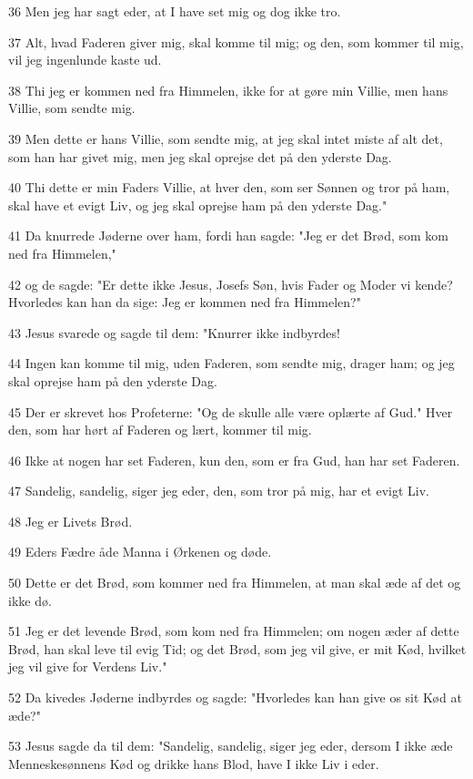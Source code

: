\par 36 Men jeg har sagt eder, at I have set mig og dog ikke tro.
\par 37 Alt, hvad Faderen giver mig, skal komme til mig; og den, som kommer til mig, vil jeg ingenlunde kaste ud.
\par 38 Thi jeg er kommen ned fra Himmelen, ikke for at gøre min Villie, men hans Villie, som sendte mig.
\par 39 Men dette er hans Villie, som sendte mig, at jeg skal intet miste af alt det, som han har givet mig, men jeg skal oprejse det på den yderste Dag.
\par 40 Thi dette er min Faders Villie, at hver den, som ser Sønnen og tror på ham, skal have et evigt Liv, og jeg skal oprejse ham på den yderste Dag."
\par 41 Da knurrede Jøderne over ham, fordi han sagde: "Jeg er det Brød, som kom ned fra Himmelen,"
\par 42 og de sagde: "Er dette ikke Jesus, Josefs Søn, hvis Fader og Moder vi kende? Hvorledes kan han da sige: Jeg er kommen ned fra Himmelen?"
\par 43 Jesus svarede og sagde til dem: "Knurrer ikke indbyrdes!
\par 44 Ingen kan komme til mig, uden Faderen, som sendte mig, drager ham; og jeg skal oprejse ham på den yderste Dag.
\par 45 Der er skrevet hos Profeterne: "Og de skulle alle være oplærte af Gud." Hver den, som har hørt af Faderen og lært, kommer til mig.
\par 46 Ikke at nogen har set Faderen, kun den, som er fra Gud, han har set Faderen.
\par 47 Sandelig, sandelig, siger jeg eder, den, som tror på mig, har et evigt Liv.
\par 48 Jeg er Livets Brød.
\par 49 Eders Fædre åde Manna i Ørkenen og døde.
\par 50 Dette er det Brød, som kommer ned fra Himmelen, at man skal æde af det og ikke dø.
\par 51 Jeg er det levende Brød, som kom ned fra Himmelen; om nogen æder af dette Brød, han skal leve til evig Tid; og det Brød, som jeg vil give, er mit Kød, hvilket jeg vil give for Verdens Liv."
\par 52 Da kivedes Jøderne indbyrdes og sagde: "Hvorledes kan han give os sit Kød at æde?"
\par 53 Jesus sagde da til dem: "Sandelig, sandelig, siger jeg eder, dersom I ikke æde Menneskesønnens Kød og drikke hans Blod, have I ikke Liv i eder.
